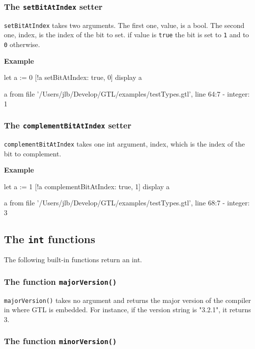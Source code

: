 \documentclass[10pt,openright,twosides]{report}
\newcommand{\icst}[1]{{\footnotesize\ttfamily\colorbox{light-blue}{#1}}}
\newcommand{\scst}[1]{{\footnotesize\ttfamily\colorbox{light-blue}{"#1"}}}
\newcommand{\gtlarg}[1]{{\footnotesize\ttfamily\colorbox{light-blue}{#1}}}
\newcommand{\gtlinline}[1]{\colorbox{light-blue}{\lstinline[language=gtl]{#1}}}
\newcommand{\example}{\vspace{.75em}\noindent\textbf{Example}\vspace{0em}}
\begin{document}
\subsubsection{The \texttt{setBitAtIndex} setter}

\gtlinline{setBitAtIndex} takes two arguments. The first one, \gtlarg{value}, is a bool. The second one, \gtlarg{index}, is the index of the bit to set. if \gtlarg{value} is \gtlinline{true} the bit is set to \gtlinline{1} and to \gtlinline{0} otherwise.

\example
\begin{gtl}
let a := 0
[!a setBitAtIndex: true, 0]
display a
\end{gtl}
\begin{console}
a from file '/Users/jlb/Develop/GTL/examples/testTypes.gtl', line 64:7
  - integer: 1
\end{console}

\subsubsection{The \texttt{complementBitAtIndex} setter}

\gtlinline{complementBitAtIndex} takes one int argument, \gtlarg{index}, which is the index of the bit to complement. 

\example
\begin{gtl}
let a := 1
[!a complementBitAtIndex: true, 1]
display a
\end{gtl}
\begin{console}
a from file '/Users/jlb/Develop/GTL/examples/testTypes.gtl', line 68:7
  - integer: 3
\end{console}

\subsection{The \texttt{int} functions}

The following built-in functions return an int.

\subsubsection{The function \texttt{majorVersion()}}

\gtlinline{majorVersion()} takes no argument and returns the major version of the compiler in where GTL is embedded. For instance, if the version string is \scst{3.2.1}, it returns \icst{3}.

\subsubsection{The function \texttt{minorVersion()}}
\end{document}
